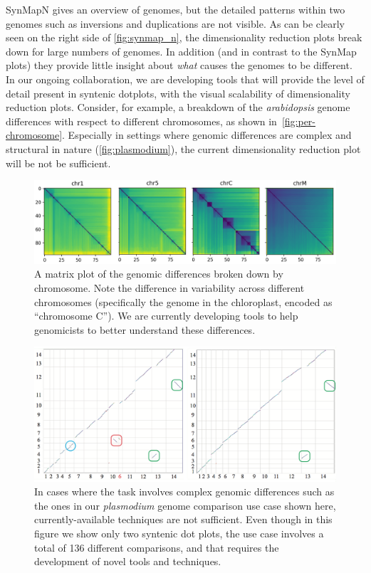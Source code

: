 \documentclass{vgtc}                      %
\begin{document}
SynMapN gives an overview of genomes, but the detailed patterns within two genomes such as inversions and duplications are not visible.
As can be clearly seen on the right side of \autoref{fig:synmap_n}, the dimensionality reduction plots break down for large numbers of genomes. In addition (and in contrast to the SynMap plots) they provide little insight about \emph{what} causes the genomes to be different. In our ongoing collaboration, we are developing tools that will provide the level of detail present in syntenic dotplots, with the visual scalability of dimensionality reduction plots. Consider, for example, a breakdown of the \emph{arabidopsis} genome differences with respect to different chromosomes, as shown in~\autoref{fig:per-chromosome}. Especially in settings where genomic differences are complex and structural in nature (\autoref{fig:plasmodium}), the current dimensionality reduction plot will be not be sufficient.

\begin{figure}[t]
 \centering
 \includegraphics[width=\columnwidth]{chromosomes_matrix}
 \caption{A matrix plot of the genomic differences broken down by chromosome. Note the difference in variability across different chromosomes (specifically the genome in the chloroplast, encoded as ``chromosome C''). We are currently developing tools to help genomicists to better understand these differences.}
 \label{fig:per-chromosome}
\end{figure}

\begin{figure}[t]
 \centering
 \includegraphics[width=0.75\columnwidth]{plasmodium}
 \caption{In cases where the task involves complex genomic differences such as the ones in our \emph{plasmodium} genome comparison use case shown here, currently-available techniques are not sufficient. Even though in this figure we show only two syntenic dot plots, the use case involves a total of 136 different comparisons, and that requires the development of novel tools and techniques.}
 \label{fig:plasmodium}
\end{figure}
\end{document}
